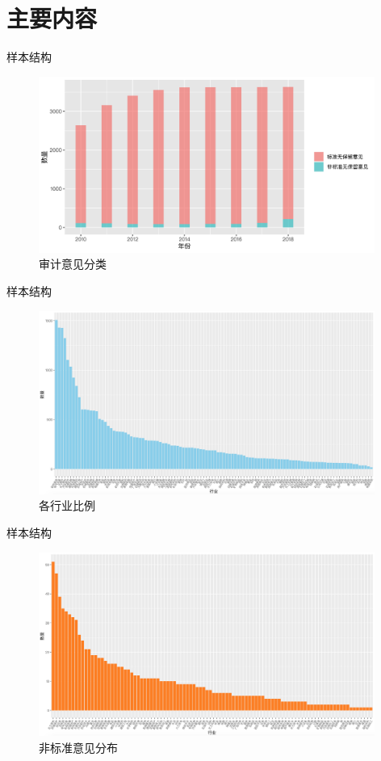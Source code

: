 \section{主要内容}


\begin{frame}[fragile]{样本结构}
    \begin{figure}
        \includegraphics[width=11cm]{Pic/样本审计意见分类图.png}
        \caption{审计意见分类}
    \end{figure}
\end{frame}

\begin{frame}[fragile]{样本结构}
    \begin{figure}
        \includegraphics[width=11cm]{Pic/样本比例.png}
        \caption{各行业比例}
    \end{figure}
\end{frame}

\begin{frame}[fragile]{样本结构}
    \begin{figure}
        \includegraphics[width=11cm]{Pic/样本中非标准意见分布.png}
        \caption{非标准意见分布}
    \end{figure}
\end{frame}

